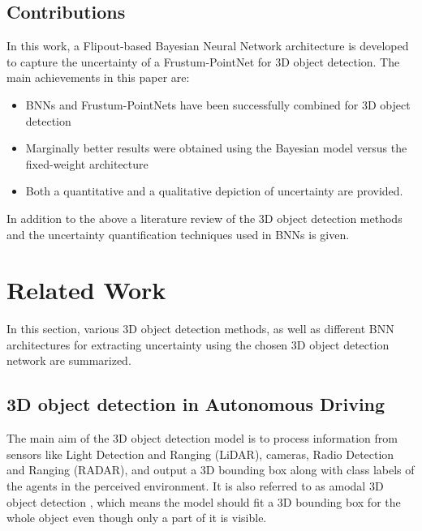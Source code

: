 \documentclass[10pt,twocolumn,letterpaper]{article}
\begin{document}
\subsection{Contributions}
In this work, a Flipout-based Bayesian Neural Network \cite{Wen2018} architecture is developed to capture the uncertainty of a Frustum-PointNet for 3D object detection. The main achievements in this paper are: 
\begin{itemize}
    \item BNNs and Frustum-PointNets have been successfully combined for 3D object detection 
    \item Marginally better results were obtained using the Bayesian model versus the fixed-weight architecture
    \item Both a quantitative and a qualitative depiction of uncertainty are provided.
\end{itemize}
    
    In addition to the above a literature review of the 3D object detection methods and the uncertainty quantification techniques used in BNNs is given.
\section{Related Work}
In this section, various 3D object detection methods, as well as different BNN architectures for extracting uncertainty using the chosen 3D object detection network are summarized.

\subsection{3D object detection in Autonomous Driving}
The main aim of the 3D object detection model is to process information from sensors like Light Detection and Ranging (LiDAR), cameras, Radio Detection and Ranging (RADAR), and output a 3D bounding box along with class labels of the agents in the perceived environment. It is also referred to as amodal 3D object detection \cite{Arnold2019}, which means the model should fit a 3D bounding box for the whole object even though only a part of it is visible.

\end{document}
